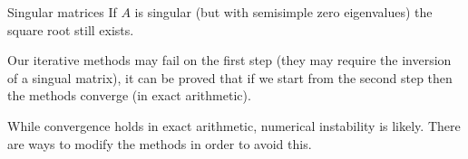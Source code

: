 \documentclass{beamer}
\theoremstyle{plain}
\theoremstyle{definition}
\theoremstyle{remark}
\begin{document}
\begin{frame}{Singular matrices}
  If $A$ is singular (but with semisimple zero eigenvalues) the square
  root still exists.

  Our iterative methods may fail on the first step (they may require
  the inversion of a singual matrix), it can be proved that if we
  start from the second step then the methods converge (in exact
  arithmetic).  \vfill
  
  While convergence holds in exact arithmetic, numerical instability
  is likely. There are ways to modify the methods in order to avoid
  this.
\end{frame}
\end{document}
